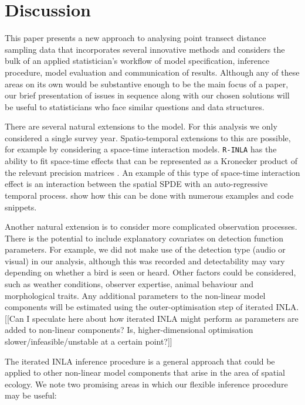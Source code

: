 \documentclass{stylefile16/statsoc}
\begin{document}
\section{Discussion}
\label{sec-discussion}

This paper presents a new approach to analysing point transect distance sampling data that incorporates several innovative methods and considers the bulk of an applied statistician's workflow of model specification, inference procedure, model evaluation and communication of results.  Although any of these areas on its own would be substantive enough to be the main focus of a paper, our brief presentation of issues in sequence along with our chosen solutions will be useful to statisticians who face similar questions and data structures.

There are several natural extensions to the model.  For this analysis we only considered a single survey year.  Spatio-temporal extensions to this are possible, for example by considering a space-time interaction models.  \texttt{R-INLA} has the ability to fit space-time effects that can be represented as a Kronecker product of the relevant precision matrices \citep{blangiardo_spatial_2013, yuan_point_2017}.  An example of this type of space-time interaction effect is an interaction between the spatial SPDE with an auto-regressive temporal process.  \cite{blangiardo_spatial_2013} show how this can be done with numerous examples and code snippets.

Another natural extension is to consider more complicated observation processes.  There is the potential to include explanatory covariates on detection function parameters.  For example, we did not make use of the detection type (audio or visual) in our analysis, although this was recorded and detectability may vary depending on whether a bird is seen or heard.  Other factors could be considered, such as weather conditions, observer expertise, animal behaviour and morphological traits.  Any additional parameters to the non-linear model components will be estimated using the outer-optimisation step of iterated INLA.  [[Can I speculate here about how iterated INLA might perform as parameters are added to non-linear components?  Is, higher-dimensional optimisation slower/infeasible/unstable at a certain point?]]

The iterated INLA inference procedure is a general approach that could be applied to other non-linear model components that arise in the area of spatial ecology.  We note two promising areas in which our flexible inference procedure may be useful:
\end{document}
